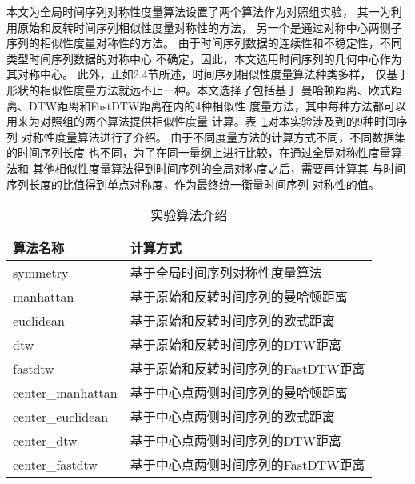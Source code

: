 本文为全局时间序列对称性度量算法设置了两个算法作为对照组实验，
其一为利用原始和反转时间序列相似性度量对称性的方法，
另一个是通过对称中心两侧子序列的相似性度量对称性的方法。
由于时间序列数据的连续性和不稳定性，不同类型时间序列数据的对称中心
不确定，因此，本文选用时间序列的几何中心作为其对称中心。
此外，正如2.4节所述，时间序列相似性度量算法种类多样，
仅基于形状的相似性度量方法就远不止一种。本文选择了包括基于
曼哈顿距离、欧式距离、DTW距离和FastDTW距离在内的4种相似性
度量方法，其中每种方法都可以用来为对照组的两个算法提供相似性度量
计算。表~\ref{tab:experiment_algorithm}对本实验涉及到的9种时间序列
对称性度量算法进行了介绍。
由于不同度量方法的计算方式不同，不同数据集的时间序列长度
也不同，为了在同一量纲上进行比较，在通过全局对称性度量算法和
其他相似性度量算法得到时间序列的全局对称度之后，需要再计算其
与时间序列长度的比值得到单点对称度，作为最终统一衡量时间序列
对称性的值。
\begin{table}
  \centering
  \caption{实验算法介绍}
  \begin{tabular}{ll}
    \toprule
    算法名称          & 计算方式                            \\
    \midrule
    symmetry          & 基于全局时间序列对称性度量算法      \\
    manhattan         & 基于原始和反转时间序列的曼哈顿距离  \\
    euclidean         & 基于原始和反转时间序列的欧式距离    \\
    dtw               & 基于原始和反转时间序列的DTW距离     \\
    fastdtw           & 基于原始和反转时间序列的FastDTW距离 \\
    center\_manhattan & 基于中心点两侧时间序列的曼哈顿距离  \\
    center\_euclidean & 基于中心点两侧时间序列的欧式距离    \\
    center\_dtw       & 基于中心点两侧时间序列的DTW距离     \\
    center\_fastdtw   & 基于中心点两侧时间序列的FastDTW距离 \\
    \bottomrule
  \end{tabular}
  \label{tab:experiment_algorithm}
\end{table}

